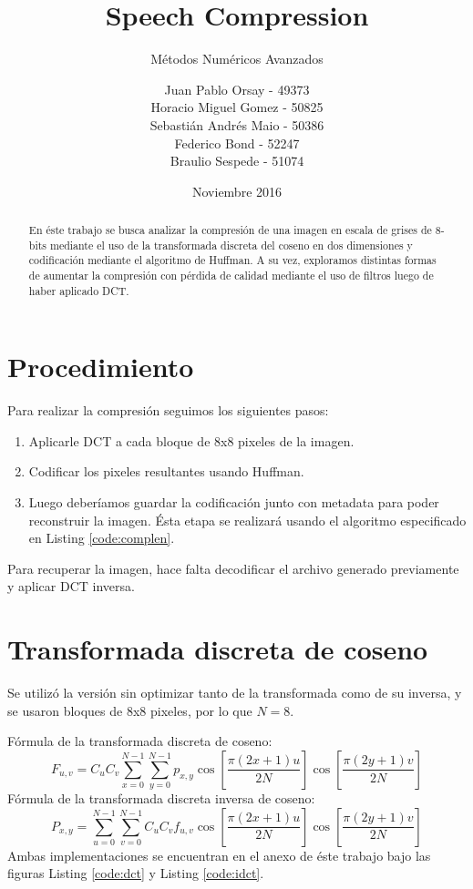 \documentclass[spanish]{scrartcl}
\subtitle{Métodos Numéricos Avanzados}
\title{Speech Compression}
\author{
Juan Pablo Orsay - 49373 \\
Horacio Miguel Gomez - 50825 \\
Sebastián Andrés Maio - 50386 \\
Federico Bond - 52247 \\
Braulio Sespede - 51074
}
\date{Noviembre 2016}
\let\endtitlepage\relax
\begin{document}
\maketitle
\endtitlepage

\begin{abstract}
En éste trabajo se busca analizar la compresión de una imagen en escala de grises de 8-bits mediante el uso de la transformada discreta del coseno en dos dimensiones y codificación mediante el algoritmo de Huffman. A su vez, exploramos distintas formas de aumentar la compresión con pérdida de calidad mediante el uso de filtros luego de haber aplicado DCT.
\end{abstract}
\break
\tableofcontents
\break
\section{Procedimiento}
Para realizar la compresión seguimos los siguientes pasos:
\begin{enumerate}
\item Aplicarle DCT a cada bloque de 8x8 pixeles de la imagen.
\item Codificar los pixeles resultantes usando Huffman.
\item Luego deberíamos guardar la codificación junto con metadata para poder reconstruir la imagen. Ésta etapa se realizará usando el algoritmo especificado en Listing \ref{code:complen}.
\end{enumerate}
Para recuperar la imagen, hace falta decodificar el archivo generado previamente y aplicar DCT inversa.
\section{Transformada discreta de coseno}
Se utilizó la versión sin optimizar tanto de la transformada como de su inversa, y
 se usaron bloques de 8x8 pixeles, por lo que $N = 8$.
 
 Fórmula de la transformada discreta de coseno\cite{mathworks_DCT}\cite{wikipedia_DCT}:
\begin{equation}
\label{eq:dct}
F_{u,v} =
 C_{u} C_{v} \sum_{x=0}^{N-1}
 \sum_{y=0}^{N-1}
 p_{x,y}
\cos \left[\frac{\pi \left(2 x + 1\right) u}{2 N} \right]
\cos \left[\frac{\pi \left(2 y + 1\right) v}{2 N} \right]
\end{equation}
Fórmula de la transformada discreta inversa de coseno\cite{mathworks_DCT}:
\begin{equation}
\label{eq:idct}
P_{x,y} =
 \sum_{u=0}^{N-1}
 \sum_{v=0}^{N-1}
 C_{u} C_{v}
 f_{u,v}
\cos \left[\frac{\pi \left(2 x + 1\right) u}{2 N} \right]
\cos \left[\frac{\pi \left(2 y + 1\right) v}{2 N} \right]
\end{equation}
Ambas implementaciones se encuentran en el anexo de éste trabajo bajo las figuras Listing \ref{code:dct} y Listing \ref{code:idct}.
\end{document}
